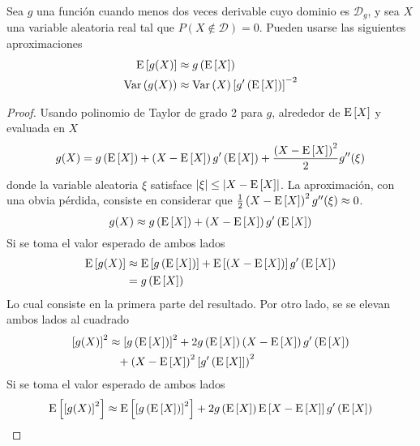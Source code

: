 \begin{proposicion}
Sea $g$ una función cuando menos dos veces derivable cuyo dominio es $\mathcal{D}_g$, y sea $X$ una variable aleatoria real tal que $P(X\notin \mathcal{D}) = 0$. 
Pueden usarse las siguientes aproximaciones
\begin{align}
\mathrm{E}\left[ g(X) \right] &\approx g\left( \mathrm{E}\left[ X \right] \right) \\
\mathrm{Var}\left( g(X) \right) &\approx \mathrm{Var}\left( X \right) \left[ g^{\prime} \left( \mathrm{E}\left[ X \right] \right) \right]^{-2}
\end{align}
\end{proposicion}

\begin{proof}
Usando polinomio de Taylor de grado 2 para $g$, alrededor de $\mathrm{E}\left[ X \right]$ y evaluada en $X$
\begin{equation}
g(X) = g\left( \mathrm{E}\left[ X \right] \right) + \left(X - \mathrm{E}\left[ X \right] \right) g^{\prime} \left( \mathrm{E}\left[ X \right] \right) + \frac{\left( X - \mathrm{E}\left[ X \right] \right)^{2}}{2} g^{\prime \prime}(\xi)
\end{equation}
donde la variable aleatoria $\xi$ satisface $\left| \xi \right| \leq \left| X - \mathrm{E}\left[ X \right] \right|$.
%
La aproximación, con una obvia pérdida, consiste en considerar que $\frac{1}{2}\left( X - \mathrm{E}\left[ X \right] \right)^{2} g^{\prime \prime}(\xi) \approx 0$.
\begin{equation}
g(X) \approx g\left( \mathrm{E}\left[ X \right] \right) + \left(X - \mathrm{E}\left[ X \right] \right) g^{\prime} \left( \mathrm{E}\left[ X \right] \right)
\end{equation}
Si se toma el valor esperado de ambos lados
\begin{align*}
\mathrm{E}\left[ g(X) \right] &\approx \mathrm{E}\left[ g\left( \mathrm{E}\left[ X \right] \right) \right] + \mathrm{E}\left[ \left(X - \mathrm{E}\left[ X \right] \right) \right] g^{\prime} \left( \mathrm{E}\left[ X \right] \right) \\
&= g\left( \mathrm{E}\left[ X \right] \right)
\end{align*}
Lo cual consiste en la primera parte del resultado. Por otro lado, se se elevan ambos lados al cuadrado
\begin{align}
\left[g(X)\right]^{2} &\approx \left[g\left( \E{X} \right)\right]^{2} + 2 g\left( \E{X} \right) \left(X - \E{X} \right) g\prima \left( \E{X} \right) \nonumber \\
&\pheq + \left(X - \E{X} \right)^{2} \left[ g\prima \left( \E{X} \right] \right)^{2}
\end{align}
Si se toma el valor esperado de ambos lados
\begin{align*}
\E{\left[g(X)\right]^{2}} &\approx \E{\left[g\left( \E{X} \right)\right]^{2}} + 2 g\left( \E{X} \right) \E{X - \E{X} } g\prima \left( \E{X} \right) \nonumber \\

\end{align*}
\end{proof}
